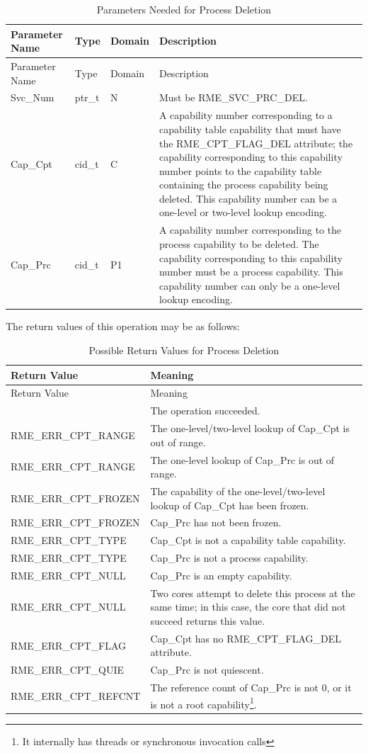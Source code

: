 \begin{xltabular}{\textwidth}{@{}>{\hsize\raggedright\arraybackslash}X>{\hsize\raggedright\arraybackslash}X>{\hsize\raggedright\arraybackslash}X>{\hsize\raggedright\arraybackslash}X@{}}
\caption{Parameters Needed for Process Deletion}\label{tab:4-12-delete-process-parameters}\\
\toprule
Parameter Name & Type & Domain & Description\tabularnewline
\endfirsthead
\toprule
Parameter Name & Type & Domain & Description\tabularnewline
\midrule
\endhead
\bottomrule
\endlastfoot
Svc\_Num & ptr\_t & N & Must be RME\_SVC\_PRC\_DEL.\tabularnewline
Cap\_Cpt & cid\_t & C &
A capability number corresponding to a capability table capability that must have the RME\_CPT\_FLAG\_DEL attribute; the capability corresponding to this capability number points to the capability table containing the process capability being deleted. This capability number can be a one-level or two-level lookup encoding.\tabularnewline
Cap\_Prc & cid\_t & P1 &
A capability number corresponding to the process capability to be deleted. The capability corresponding to this capability number must be a process capability. This capability number can only be a one-level lookup encoding.\tabularnewline
\end{xltabular}
\nopagebreak[4]

The return values of this operation may be as follows:

\begin{xltabular}{\textwidth}{@{}>{\hsize\raggedright\arraybackslash}X>{\hsize\raggedright\arraybackslash}X@{}}
\caption{Possible Return Values for Process Deletion}\label{tab:4-13-delete-process-return-values}\\
\toprule
Return Value & Meaning\tabularnewline
\endfirsthead
\toprule
Return Value & Meaning\tabularnewline
\midrule
\endhead
\bottomrule
{} & The operation succeeded.\tabularnewline
    RME\_ERR\_CPT\_RANGE & The one-level/two-level lookup of Cap\_Cpt is out of range.\tabularnewline
    RME\_ERR\_CPT\_RANGE & The one-level lookup of Cap\_Prc is out of range.\tabularnewline
    RME\_ERR\_CPT\_FROZEN & The capability of the one-level/two-level lookup of Cap\_Cpt has been frozen.\tabularnewline
    RME\_ERR\_CPT\_FROZEN & Cap\_Prc has not been frozen.\tabularnewline
    RME\_ERR\_CPT\_TYPE & Cap\_Cpt is not a capability table capability.\tabularnewline
    RME\_ERR\_CPT\_TYPE & Cap\_Prc is not a process capability.\tabularnewline
    RME\_ERR\_CPT\_NULL & Cap\_Prc is an empty capability.\tabularnewline
    RME\_ERR\_CPT\_NULL & Two cores attempt to delete this process at the same time; in this case, the core that did not succeed returns this value.\tabularnewline
    RME\_ERR\_CPT\_FLAG & Cap\_Cpt has no RME\_CPT\_FLAG\_DEL attribute.\tabularnewline
    RME\_ERR\_CPT\_QUIE & Cap\_Prc is not quiescent.\tabularnewline
    RME\_ERR\_CPT\_REFCNT & The reference count of Cap\_Prc is not 0, or it is not a root capability\footnote{It internally has threads or synchronous invocation calls}.\tabularnewline
\end{xltabular}
\nopagebreak[4]

